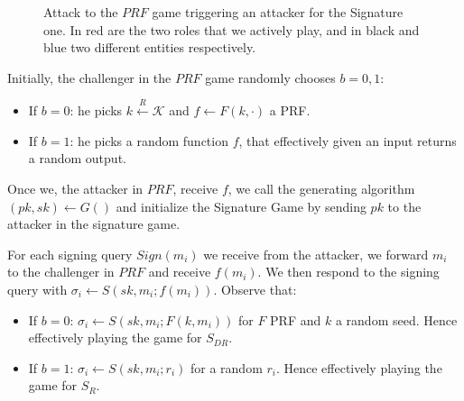 \begin{figure}[h!]
    \caption{Attack to the $PRF$ game triggering an attacker for the Signature one. In red are the two roles that we actively play, and in black and blue two different entities respectively.\label{fig:attack-game}}
\end{figure}

Initially, the challenger in the $PRF$ game randomly chooses $b = 0,1$:
\begin{itemize}
    \item If $b = 0$: he picks $k \overset{R}{\longleftarrow} \mathcal{K}$ and $f \leftarrow F(k, \cdot)$ a PRF.
    \item If $b = 1$: he picks a random function $f$, that effectively given an input returns a random output.
\end{itemize}
Once we, the attacker in $PRF$, receive $f$, we call the generating algorithm $(pk, sk) \leftarrow G()$ and initialize the Signature Game by sending $pk$ to the attacker in the signature game.

For each signing query $Sign(m_i)$ we receive from the attacker, we forward $m_i$ to the challenger in $PRF$ and receive $f(m_i)$.
We then respond to the signing query with $\sigma_i \leftarrow S(sk, m_i; f(m_i))$.
Observe that:
\begin{itemize}
    \item If $b = 0$: $\sigma_i \leftarrow S(sk, m_i; F(k, m_i))$ for $F$ PRF and $k$ a random seed. Hence effectively playing the game for $S_{DR}$.
    \item If $b = 1$: $\sigma_i \leftarrow S(sk, m_i; r_i)$ for a random $r_i$. Hence effectively playing the game for $S_R$.
\end{itemize}

